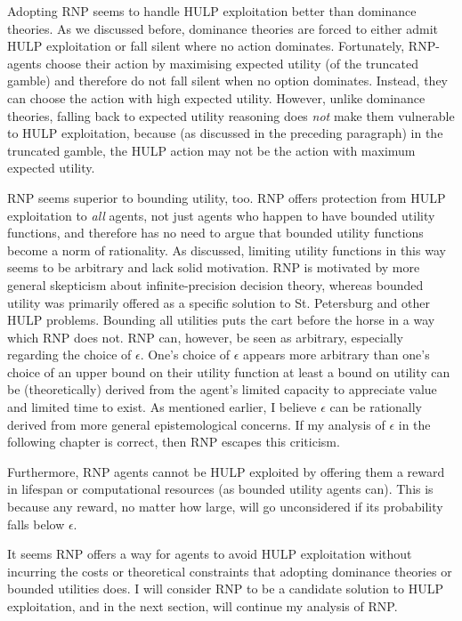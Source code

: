 \documentclass{article}
\begin{document}
Adopting RNP seems to handle HULP exploitation better than dominance theories. As we discussed before, dominance theories are forced to either admit HULP exploitation or fall silent where no action dominates. Fortunately, RNP-agents choose their action by maximising expected utility (of the truncated gamble) and therefore do not fall silent when no option dominates. Instead, they can choose the action with high expected utility. However, unlike dominance theories, falling back to expected utility reasoning does \textit{not} make them vulnerable to HULP exploitation, because (as discussed in the preceding paragraph) in the truncated gamble, the HULP action may not be the action with maximum expected utility. 

RNP seems superior to bounding utility, too. RNP offers protection from HULP exploitation to \textit{all} agents, not just agents who happen to have bounded utility functions, and therefore has no need to argue that bounded utility functions become a norm of rationality. As discussed, limiting utility functions in this way seems to be arbitrary and lack solid motivation. RNP is motivated by more general skepticism about infinite-precision decision theory, whereas bounded utility was primarily offered as a specific solution to St. Petersburg and other HULP problems. Bounding all utilities puts the cart before the horse in a way which RNP does not. RNP can, however, be seen as arbitrary, especially regarding the choice of \(\epsilon\). One's choice of \(\epsilon\) appears more arbitrary than one's choice of an upper bound on their utility function \textemdash{} at least a bound on utility can be (theoretically) derived from the agent's limited capacity to appreciate value and limited time to exist. As mentioned earlier, I believe \(\epsilon\) can be rationally derived from more general epistemological concerns. If my analysis of \(\epsilon\) in the following chapter is correct, then RNP escapes this criticism.

Furthermore, RNP agents cannot be HULP exploited by offering them a reward in lifespan or computational resources (as bounded utility agents can). This is because any reward, no matter how large, will go unconsidered if its probability falls below \(\epsilon\).

It seems RNP offers a way for agents to avoid HULP exploitation without incurring the costs or theoretical constraints that adopting dominance theories or bounded utilities does. I will consider RNP to be a candidate solution to HULP exploitation, and in the next section, will continue my analysis of RNP.
\end{document}
